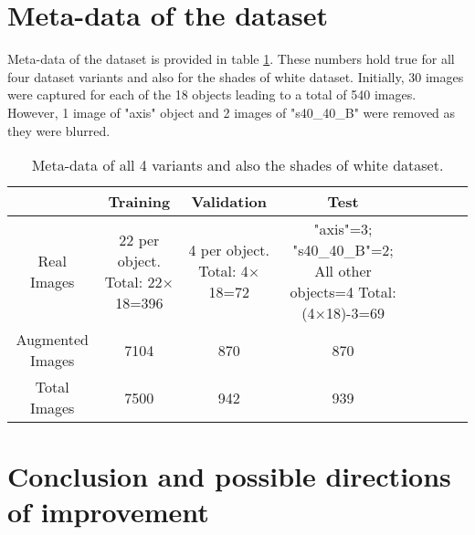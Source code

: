 \documentclass[paper=a4,11pt,parskip=half,toc=listof]{scrartcl}
\begin{document}
\newpage
\section{Meta-data of the dataset}

Meta-data of the dataset is provided in table \ref{Table:meta}. These numbers hold true for all four dataset variants and also for the shades of white dataset. Initially, 30 images were captured for each of the 18 objects leading to a total of 540 images. However, 1 image of "axis" object and 2 images of "s40\_40\_B" were removed as they were blurred.

\begin{table}[!htb]
	\centering
	\begin{tabular}{|c|c|c|c|c|c|c|c|}
	\hline 
    & Training & Validation & Test \\ 
	\hline 
	Real Images & \makecell{22 per object.\\ Total: 22$\times$18=396} & \makecell{4 per object.\\ Total: 4$\times$18=72} & 				\makecell{"axis"=3; \\"s40\_40\_B"=2; \\All other objects=4\\ Total: (4$\times$18)-3=69} \\ 
	\hline 
	Augmented Images & 7104 & 870 & 870 \\ 
	\hline 
	Total Images & 7500 & 942 & 939 \\ 
	\hline 
	\end{tabular}
	\caption{Meta-data of all 4 variants and also the shades of white dataset.} 
	\label{Table:meta}
\end{table}

\section{Conclusion and possible directions of improvement}
\end{document}
